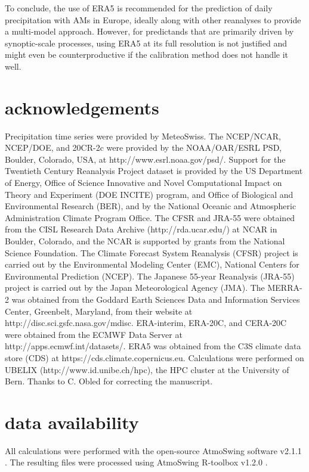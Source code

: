 \documentclass[alpha-refs]{wiley-article}
\begin{document}
To conclude, the use of ERA5 is recommended for the prediction of daily precipitation with AMs in Europe, ideally along with other reanalyses to provide a multi-model approach. However, for predictands that are primarily driven by synoptic-scale processes, using ERA5 at its full resolution is not justified and might even be counterproductive if the calibration method does not handle it well.



\section*{acknowledgements}
Precipitation time series were provided by MeteoSwiss. The NCEP/NCAR, NCEP/DOE, and 20CR-2c were provided by the NOAA/OAR/ESRL PSD, Boulder, Colorado, USA, at http://www.esrl.noaa.gov/psd/. Support for the Twentieth Century Reanalysis Project dataset is provided by the US Department of Energy, Office of Science Innovative and Novel Computational Impact on Theory and Experiment (DOE INCITE) program, and Office of Biological and Environmental Research (BER), and by the National Oceanic and Atmospheric Administration Climate Program Office. The CFSR and JRA-55 were obtained from the CISL Research Data Archive (http://rda.ucar.edu/) at NCAR in Boulder, Colorado, and the NCAR is supported by grants from the National Science Foundation. The Climate Forecast System Reanalysis (CFSR) project is carried out by the Environmental Modeling Center (EMC), National Centers for Environmental Prediction (NCEP). The Japanese 55-year Reanalysis (JRA-55) project is carried out by the Japan Meteorological Agency (JMA). The MERRA-2 was obtained from the Goddard Earth Sciences Data and Information Services Center, Greenbelt, Maryland, from their website at http://disc.sci.gsfc.nasa.gov/mdisc. ERA-interim, ERA-20C, and CERA-20C were obtained from the ECMWF Data Server at http://apps.ecmwf.int/datasets/. ERA5 was obtained from the C3S climate data store (CDS) at https://cds.climate.copernicus.eu. Calculations were performed on UBELIX (http://www.id.unibe.ch/hpc), the HPC cluster at the University of Bern. Thanks to C. Obled for correcting the manuscript.


\section*{data availability}
All calculations were performed with the open-source AtmoSwing software v2.1.1 \citep{Horton2019c}. The resulting files were processed using AtmoSwing R-toolbox v1.2.0 \citep{Horton2018d}.
\end{document}
